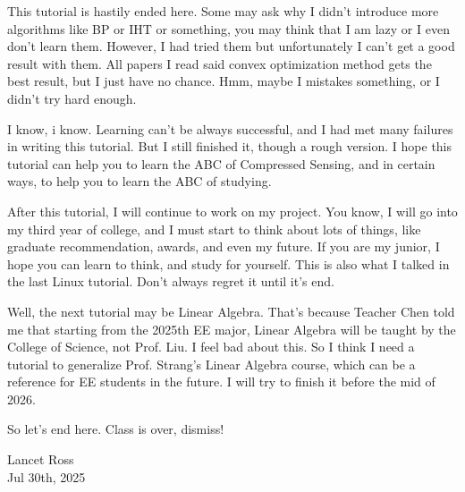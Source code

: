 \documentclass[10pt,a4paper,oneside,numbers=noenddot]{scrbook}
\theoremstyle{ctplain}
\theoremstyle{ctresult}
\begin{document}
\linespread{1.55}\selectfont

This tutorial is hastily ended here. Some may ask why I didn't introduce more
algorithms like BP or IHT or something, you may think that I am lazy or I even don't
learn them. However, I had tried them but unfortunately I can't get a good result with
them. All papers I read said convex optimization method gets the best result, but I just
have no chance. Hmm,  maybe I mistakes something, or I didn't try hard enough.

I know, i know. Learning can't be always successful, and I had met many failures
in writing this tutorial. But I still finished it, though a rough version. I hope
this tutorial can help you to learn the ABC of Compressed Sensing, and in certain ways,
to help you to learn the ABC of studying.

After this tutorial, I will continue to work on my project. You know, I will go into
my third year of college, and I must start to think about lots of things, like
graduate recommendation, awards, and even my future. If you are my junior, I hope
you can learn to think, and study for yourself. This is also what I talked in the
last Linux tutorial. Don't always regret it until it's end.

Well, the next tutorial may be Linear Algebra. That's because Teacher Chen told me
that starting from the 2025th EE major, Linear Algebra will be taught by the College
of Science, not Prof. Liu. I feel bad about this. So I think I need a tutorial to
generalize Prof. Strang's Linear Algebra course, which can be a reference for
EE students in the future. I will try to finish it before the mid of 2026.

So let's end here. Class is over, dismiss!

\begin{flushright}
  Lancet Ross\\
  Jul 30th, 2025
\end{flushright}

\newpage
\linespread{1.2}\selectfont
\end{document}
